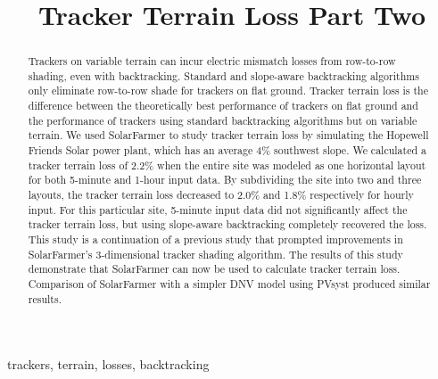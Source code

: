 \documentclass[conference]{IEEEtran}
\begin{document}
\title{Tracker Terrain Loss Part Two}

\author{
	}

\maketitle

\begin{abstract}
Trackers on variable terrain can incur electric mismatch losses from row-to-row shading, even with backtracking. Standard and slope-aware backtracking algorithms only eliminate row-to-row shade for trackers on flat ground. Tracker terrain loss is the difference between the theoretically best performance of trackers on flat ground and the performance of trackers using standard backtracking algorithms but on variable terrain. We used SolarFarmer to study tracker terrain loss by simulating the Hopewell Friends Solar power plant, which has an average 4\% southwest slope. We calculated a tracker terrain loss of 2.2\% when the entire site was modeled as one horizontal layout for both 5-minute and 1-hour input data. By subdividing the site into two and three layouts, the tracker terrain loss decreased to 2.0\% and 1.8\% respectively for hourly input. For this particular site, 5-minute input data did not significantly affect the tracker terrain loss, but using slope-aware backtracking completely recovered the loss. This study is a continuation of a previous study that prompted improvements in SolarFarmer's 3-dimensional tracker shading algorithm. The results of this study demonstrate that SolarFarmer can now be used to calculate tracker terrain loss. Comparison of SolarFarmer with a simpler DNV model using PVsyst produced similar results.
\end{abstract}

\begin{IEEEkeywords}
trackers, terrain, losses, backtracking
\end{IEEEkeywords}
\end{document}
